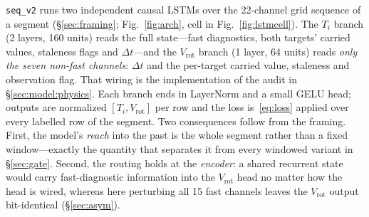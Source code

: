 \documentclass[10pt]{article}
\newcommand{\Ti}{\ensuremath{T_i}}
\newcommand{\Vrot}{\ensuremath{V_\mathrm{rot}}}
\newcommand{\seqv}{\texttt{seq\_v2}}
\begin{document}
\seqv{} runs two independent causal LSTMs over the 22-channel grid sequence of a
segment (\S\ref{sec:framing}; Fig.~\ref{fig:arch}, cell in Fig.~\ref{fig:lstmcell}). The \Ti{} branch (2 layers, 160 units) reads the
full state---fast diagnostics, both targets' carried values, staleness flags and
$\Delta t$---and the \Vrot{} branch (1 layer, 64 units) reads \emph{only the seven
non-fast channels}: $\Delta t$ and the per-target carried value, staleness and
observation flag. That wiring is the implementation of the audit in
\S\ref{sec:model:physics}. Each branch ends in LayerNorm and a small GELU head;
outputs are normalized $[\Ti, \Vrot]$ per row and the loss is~\eqref{eq:loss} applied
over every labelled row of the segment. Two consequences follow from the framing.
First, the model's \emph{reach} into the past is the whole segment rather than a
fixed window---exactly the quantity that separates it from every windowed variant
in \S\ref{sec:gate}. Second, the routing holds at the \emph{encoder}: a shared
recurrent state would carry fast-diagnostic information into the \Vrot{} head no
matter how the head is wired, whereas here perturbing all 15 fast channels leaves
the \Vrot{} output bit-identical (\S\ref{sec:asym}).
\end{document}
